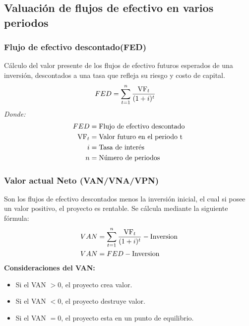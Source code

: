 \documentclass{templateNote}
\begin{document}
\subsection{Valuación de flujos de efectivo en varios periodos}
\subsubsection{Flujo de efectivo descontado(FED)} 
\noindent Cálculo del valor presente de los flujos de efectivo futuros esperados de una inversión, descontados a una tasa que refleja su riesgo y costo de capital.
\begin{align*}
    FED &= \sum_{t=1}^{n} \frac{{\textnormal{VF}}_t}{(1 + i)^t}
\end{align*}
\textit{Donde:}
\begin{align*}
    FED &= \textnormal{Flujo de efectivo descontado}\\
    \textnormal{VF}_t &= \textnormal{Valor futuro en el periodo t}\\
    i &= \textnormal{Tasa de interés}\\
    n &= \textnormal{Número de periodos}\\
\end{align*}

\subsubsection{Valor actual Neto (VAN/VNA/VPN)}
\noindent Son los flujos de efectivo descontados menos la inversión inicial, el cual si posee un valor positivo, el proyecto es rentable. Se cálcula mediante la siguiente fórmula:
\begin{align*}
    VAN &= {\sum_{t=1}^{n} \frac{{\textnormal{VF}}_t}{(1 + i)^t}} - \textnormal{Inversion} \\
    VAN &= FED - \textnormal{Inversion}
\end{align*}
\textbf{Consideraciones del VAN:}
\begin{itemize}
    \item Si el VAN $> 0$, el proyecto crea valor.
    \item Si el VAN $< 0$, el proyecto destruye valor.
    \item Si el VAN $= 0$, el proyecto esta en un punto de equilibrio.
\end{itemize}
\end{document}
